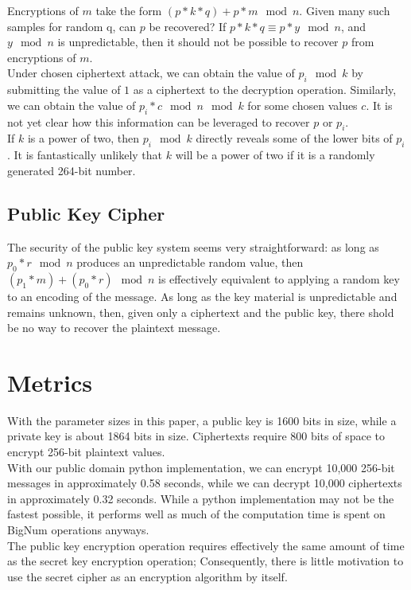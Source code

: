 \documentclass[preprint]{iacrtrans}
\begin{document}
Encryptions of $m$ take the form $(p * k * q) + p * m \mod n$. Given many such samples for random q, can $p$ be recovered? If $p * k * q \equiv p * y \mod n$, and $y \mod n$ is unpredictable, then it should not be possible to recover $p$ from encryptions of $m$.\\

Under chosen ciphertext attack, we can obtain the value of $p_i \mod k$ by submitting the value of $1$ as a ciphertext to the decryption operation. Similarly, we can obtain the value of $p_i * c \mod n \mod k$ for some chosen values $c$. It is not yet clear how this information can be leveraged to recover $p$ or $p_i$.\\

If $k$ is a power of two, then $p_i \mod k$ directly reveals some of the lower bits of $p_i$. It is fantastically unlikely that $k$ will be a power of two if it is a randomly generated 264-bit number.

\subsection{Public Key Cipher}
The security of the public key system seems very straightforward: as long as $p_0 * r \mod n$ produces an unpredictable random value, then $(p_1 * m) + (p_0 * r) \mod n$ is effectively equivalent to applying a random key to an encoding of the message. As long as the key material is unpredictable and remains unknown, then, given only a ciphertext and the public key, there shold be no way to recover the plaintext message.

\section{Metrics}
With the parameter sizes in this paper, a public key is 1600 bits in size, while a private key is about 1864 bits in size. Ciphertexts require 800 bits of space to encrypt 256-bit plaintext values. \\

With our public domain python implementation, we can encrypt 10,000 256-bit messages in approximately 0.58 seconds, while we can decrypt 10,000 ciphertexts in approximately 0.32 seconds. While a python implementation may not be the fastest possible, it performs well as much of the computation time is spent on BigNum operations anyways.\\

The public key encryption operation requires effectively the same amount of time as the secret key encryption operation; Consequently, there is little motivation to use the secret cipher as an encryption algorithm by itself. \\
\end{document}
